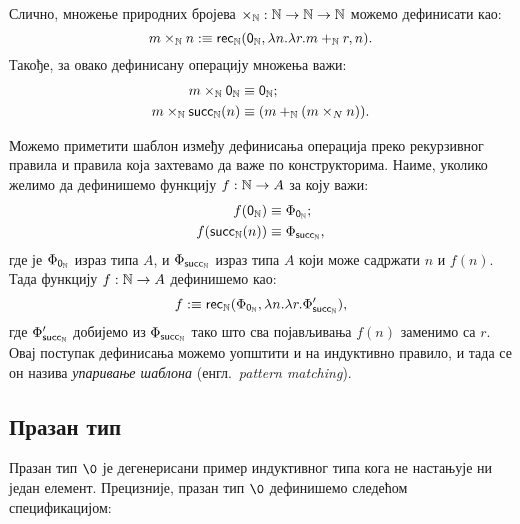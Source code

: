 \documentclass[12pt,oneside]{memoir}
\begin{document}
Слично, множење природних бројева $\times_{{\mathbb{N}}} : {\mathbb{N}} \to {\mathbb{N}} \to {\mathbb{N}}$ можемо дефинисати као:
\[m \times_{{\mathbb{N}}} n :\equiv \mathsf{rec}_{{\mathbb{N}}} (\mathsf{0}_\mathbb{N}, \lambda n.\lambda r.m +_{{\mathbb{N}}} r, n).\] 
Такође, за овако дефинисану операцију множења важи:
\begin{align*}
    m \times_{{\mathbb{N}}} \mathsf{0}_\mathbb{N}{} &\equiv{} \mathsf{0}_\mathbb{N}{}; \\
    m \times_{{\mathbb{N}}} \mathsf{succ}_\mathbb{N}(n) &\equiv{} (m +_{{\mathbb{N}}} (m \times_{N} n)).
\end{align*}

Можемо приметити шаблон између дефинисања операција преко рекурзивног правила и правила која захтевамо да важе по конструкторима. Наиме, уколико желимо да дефинишемо функцију $f : {\mathbb{N}} \to A$ за коју важи:
\begin{align*}
    f (\mathsf{0}_\mathbb{N}) &\equiv{} \Phi_{\mathsf{0}_\mathbb{N}}; \\
    f (\mathsf{succ}_\mathbb{N}(n)) &\equiv{} \Phi_{\mathsf{succ}_\mathbb{N}},
\end{align*}
где је $\Phi_{\mathsf{0}_\mathbb{N}}$ израз типа $A$, и $\Phi_{\mathsf{succ}_\mathbb{N}}$ израз типа $A$ који може садржати $n$ и $f(n)$. Тада функцију $f : {\mathbb{N}} \to A$ дефинишемо као: 
\[f :\equiv \mathsf{rec}_{{\mathbb{N}}} ({\Phi}_{\mathsf{0}_\mathbb{N}}, \lambda n. \lambda r. \Phi_{\mathsf{succ}_\mathbb{N}}'),\] 
где $\Phi_{\mathsf{succ}_\mathbb{N}}'$ добијемо из $\Phi_{\mathsf{succ}_\mathbb{N}}$ тако што сва појављивања $f(n)$ заменимо са $r$. Овај поступак дефинисања можемо уопштити и на индуктивно правило, и тада се он назива \emph{упаривање шаблона} (енгл.~\emph{pattern matching}).

\subsection{Празан тип}

Празан тип $\0$ је дегенерисани пример индуктивног типа кога не настањује ни један елемент. Прецизније, празан тип $\0$ дефинишемо следећом спецификацијом:
\end{document}
